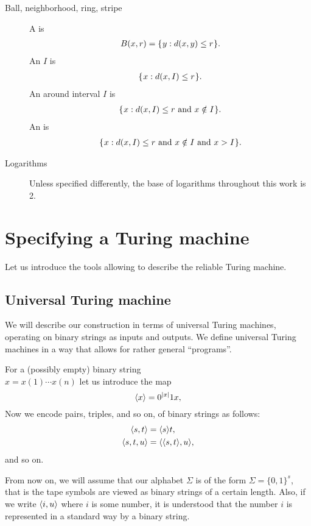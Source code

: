\documentclass[11pt]{memoir}
\theoremstyle{definition} %
\renewcommand{\le}{\leq}
\begin{document}
\begin{description}
\item [Ball, neighborhood, ring, stripe]
A  is
\begin{align*}
    B(x,r)= \setOf{y}{d(x,y)\le r}.
\end{align*}
An  \( I \) is
\begin{align*}
    \setOf{x}{d(x,I)\le r}.
\end{align*}
An  around interval \( I \) is
\begin{align*}
    \setOf{x}{d(x,I)\le r \txt{ and } x \notin I}.
\end{align*}
An  is
\begin{align*}
    \setOf{x}{d(x,I)\le r \txt{ and } x \notin I \txt{ and } x>I}.
\end{align*}

\item[Logarithms] Unless specified differently,
the base of logarithms throughout this work is 2.

\end{description}


\section{Specifying a Turing machine}\label{sec:specifying}

Let us introduce the tools allowing to describe the reliable Turing machine.

\subsection{Universal Turing machine}\label{sec:UTM}

We will describe our construction in terms of
universal Turing machines,
operating on binary strings as inputs and outputs.
We define universal Turing machines in a way that allows
for rather general ``programs''.

 \begin{definition}
For a (possibly empty) binary string\\ \( x=x(1)\dotsm x(n) \) let us introduce the map
 \[
   {\mathopen\langle x\mathclose\rangle} = 0^{\lvert x \rvert}1 x,
 \]
Now we encode pairs, triples, and so on, of binary strings as follows:
 \begin{align*}
        {\mathopen\langle s,t\mathclose\rangle} &={\mathopen\langle s\mathclose\rangle}t,
\\ {\mathopen\langle s,t,u\mathclose\rangle} &= {\mathopen\langle {\mathopen\langle s,t\mathclose\rangle},u\mathclose\rangle},
 \end{align*}
and so on.

From now on, we will assume that our alphabet \( \Sigma \)
is of the form \( \Sigma=\{0,1\}^{s} \), that is the
tape symbols are viewed as binary strings of a certain length.
Also, if we write \( {\mathopen\langle i,u\mathclose\rangle} \) where \( i \) is some number, it is understood
that the number \( i \) is represented in a standard way by a binary string.
\end{definition}
\end{document}
